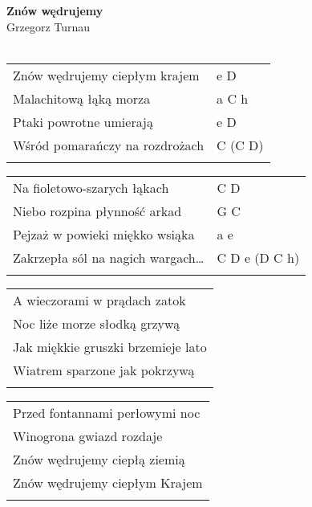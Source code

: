 \documentclass[a5paper]{article}
\begin{document}


\noindent
\fontsize{12pt}{15pt}\selectfont
\textbf{Znów wędrujemy} \\
\fontsize{8pt}{10pt}\selectfont
Grzegorz Turnau \\ \\
\fontsize{10pt}{12pt}\selectfont
{}
\begin{tabular}{@{}p{7.00cm}p{3cm}@{}}
\noindent
Znów wędrujemy ciepłym krajem & e D \\
Malachitową łąką morza & a C h \\
Ptaki powrotne umierają & e D \\
Wśród pomarańczy na rozdrożach & C (C D) \\ \\
\end{tabular}

\noindent
\begin{tabular}{@{}p{7.00cm}p{3cm}@{}}
Na fioletowo-szarych łąkach & C D \\
Niebo rozpina płynność arkad & G C \\
Pejzaż w powieki miękko wsiąka & a e \\
Zakrzepła sól na nagich wargach… & C D e (D C h) \\ \\
\end{tabular}

\noindent
\begin{tabular}{@{}p{7.00cm}@{}}
A wieczorami w prądach zatok \\
Noc liże morze słodką grzywą \\
Jak miękkie gruszki brzemieje lato \\
Wiatrem sparzone jak pokrzywą \\ \\
\end{tabular}

\noindent
\begin{tabular}{@{}p{7.00cm}@{}}
Przed fontannami perłowymi noc \\
Winogrona gwiazd rozdaje \\
Znów wędrujemy ciepłą ziemią \\
Znów wędrujemy ciepłym Krajem \\ \\
\end{tabular}
\end{document}

